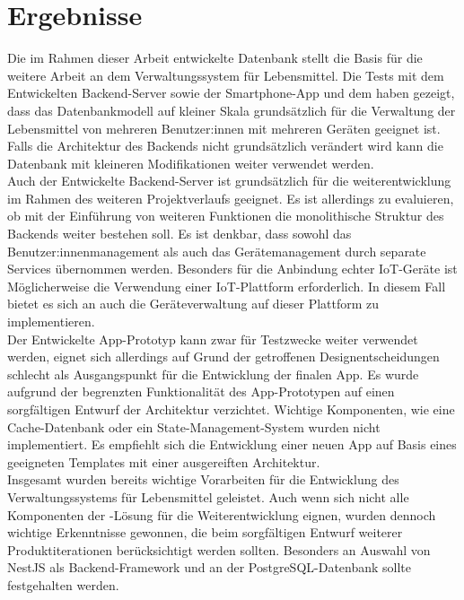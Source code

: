 \chapter{Ergebnisse}\label{ch:Ergebnisse}

Die im Rahmen dieser Arbeit entwickelte Datenbank stellt die Basis für die weitere Arbeit an dem Verwaltungssystem für Lebensmittel. Die Tests mit dem Entwickelten Backend-Server sowie der Smartphone-App und dem haben gezeigt, dass das Datenbankmodell auf kleiner Skala grundsätzlich für die Verwaltung der Lebensmittel von mehreren Benutzer:innen mit mehreren Geräten geeignet ist. Falls die Architektur des Backends nicht grundsätzlich verändert wird kann die Datenbank mit kleineren Modifikationen weiter verwendet werden.\\ Auch der Entwickelte Backend-Server ist grundsätzlich für die weiterentwicklung im Rahmen des weiteren Projektverlaufs geeignet. Es ist allerdings zu evaluieren, ob mit der Einführung von weiteren Funktionen die monolithische Struktur des Backends weiter bestehen soll. Es ist denkbar, dass sowohl das Benutzer:innenmanagement als auch das Gerätemanagement durch separate Services übernommen werden. Besonders für die Anbindung echter IoT-Geräte ist Möglicherweise die Verwendung einer IoT-Plattform erforderlich. In diesem Fall bietet es sich an auch die Geräteverwaltung auf dieser Plattform zu implementieren.\\ Der Entwickelte App-Prototyp kann zwar für Testzwecke weiter verwendet werden, eignet sich allerdings auf Grund der getroffenen Designentscheidungen schlecht als Ausgangspunkt für die Entwicklung der finalen App. Es wurde aufgrund der begrenzten Funktionalität des App-Prototypen auf einen sorgfältigen Entwurf der Architektur verzichtet. Wichtige Komponenten, wie eine Cache-Datenbank oder ein State-Management-System wurden nicht implementiert. Es empfiehlt sich die Entwicklung einer neuen App auf Basis eines geeigneten Templates mit einer ausgereiften Architektur.\\ Insgesamt wurden bereits wichtige Vorarbeiten für die Entwicklung des Verwaltungssystems für Lebensmittel geleistet. Auch wenn sich nicht alle Komponenten der -Lösung für die Weiterentwicklung eignen, wurden dennoch wichtige Erkenntnisse gewonnen, die beim sorgfältigen Entwurf weiterer Produktiterationen berücksichtigt werden sollten. Besonders an Auswahl von NestJS als Backend-Framework und an der PostgreSQL-Datenbank sollte festgehalten werden.\\